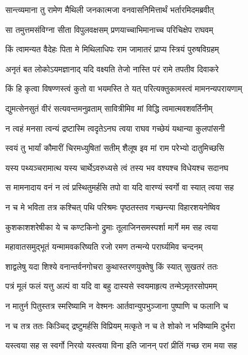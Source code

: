 
\twolineshloka
{सान्त्व्यमाना तु रामेण मैथिली जनकात्मजा}
{वनवासनिमित्तार्थं भर्तारमिदमब्रवीत्} %

\twolineshloka
{सा तमुत्तमसंविग्ना सीता विपुलवक्षसम्}
{प्रणयाच्चाभिमानाच्च परिचिक्षेप राघवम्} %

\twolineshloka
{किं त्वामन्यत वैदेहः पिता मे मिथिलाधिपः}
{राम जामातरं प्राप्य स्त्रियं पुरुषविग्रहम्} %

\twolineshloka
{अनृतं बत लोकोऽयमज्ञानाद् यदि वक्ष्यति}
{तेजो नास्ति परं रामे तपतीव दिवाकरे} %

\twolineshloka
{किं हि कृत्वा विषण्णस्त्वं कुतो वा भयमस्ति ते}
{यत् परित्यक्तुकामस्त्वं मामनन्यपरायणाम्} %

\twolineshloka
{द्युमत्सेनसुतं वीरं सत्यवन्तमनुव्रताम्}
{सावित्रीमिव मां विद्धि त्वमात्मवशवर्तिनीम्} %

\twolineshloka
{न त्वहं मनसा त्वन्यं द्रष्टास्मि त्वदृतेऽनघ}
{त्वया राघव गच्छेयं यथान्या कुलपांसनी} %

\twolineshloka
{स्वयं तु भार्यां कौमारीं चिरमध्युषितां सतीम्}
{शैलूष इव मां राम परेभ्यो दातुमिच्छसि} %

\twolineshloka
{यस्य पथ्यञ्चरामात्थ यस्य चार्थेऽवरुध्यसे}
{त्वं तस्य भव वश्यश्च विधेयश्च सदानघ} %

\twolineshloka
{स मामनादाय वनं न त्वं प्रस्थितुमर्हसि}
{तपो वा यदि वारण्यं स्वर्गो वा स्यात् त्वया सह} %

\twolineshloka
{न च मे भविता तत्र कश्चित् पथि परिश्रमः}
{पृष्ठतस्तव गच्छन्त्या विहारशयनेष्विव} %

\twolineshloka
{कुशकाशशरेषीका ये च कण्टकिनो द्रुमाः}
{तूलाजिनसमस्पर्शा मार्गे मम सह त्वया} %

\twolineshloka
{महावातसमुद्भूतं यन्मामवकरिष्यति}
{रजो रमण तन्मन्ये परार्घ्यमिव चन्दनम्} %

\twolineshloka
{शाद्वलेषु यदा शिश्ये वनान्तर्वनगोचरा}
{कुथास्तरणयुक्तेषु किं स्यात् सुखतरं ततः} %

\twolineshloka
{पत्रं मूलं फलं यत्तु अल्पं वा यदि वा बहु}
{दास्यसे स्वयमाहृत्य तन्मेऽमृतरसोपमम्} %

\twolineshloka
{न मातुर्न पितुस्तत्र स्मरिष्यामि न वेश्मनः}
{आर्तवान्युपभुञ्जाना पुष्पाणि च फलानि च} %

\twolineshloka
{न च तत्र ततः किञ्चिद् द्रष्टुमर्हसि विप्रियम्}
{मत्कृते न च ते शोको न भविष्यामि दुर्भरा} %

\twolineshloka
{यस्त्वया सह स स्वर्गो निरयो यस्त्वया विना}
{इति जानन् परां प्रीतिं गच्छ राम मया सह} %

